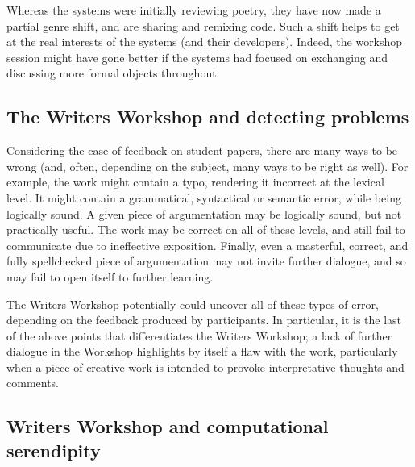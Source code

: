 Whereas the systems were initially reviewing poetry, they have now
made a partial genre shift, and are sharing and remixing code.  Such a
shift helps to get at the real interests of the systems (and their
developers).  Indeed, the workshop session might have gone better if
the systems had focused on exchanging and discussing more formal
objects throughout.

\subsection{The Writers Workshop and detecting problems}\label{sec:ww-related}

Considering the case of feedback on student papers, there are many ways to be wrong (and, often, depending on the subject, many ways to be right as well).  
For example, the work might contain a typo, rendering it incorrect at the lexical level.  It might contain a grammatical, syntactical or semantic error, while being logically sound.  A given piece of argumentation may be logically sound, but not practically useful.   The work may be correct on all of these levels, and still fail to communicate due to ineffective exposition.  Finally, even a masterful, correct, and fully spellchecked piece of argumentation may not invite further dialogue, and so may fail to open itself to further learning.

The Writers Workshop potentially could uncover all of these types of error, depending on the feedback produced by participants. In particular, it is the last of the above points that differentiates the Writers Workshop; a lack of further dialogue in the Workshop highlights by itself a flaw with the work, particularly when a piece of creative work is intended to provoke interpretative thoughts and comments. 

\subsection{Writers Workshop and computational serendipity}

